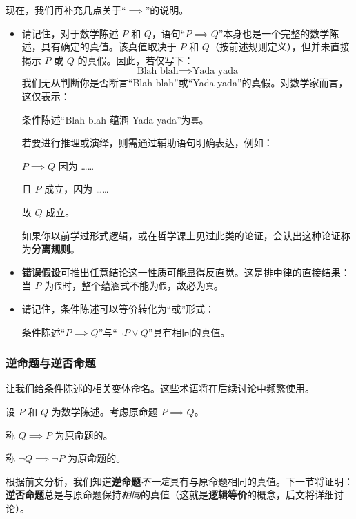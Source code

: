 现在，我们再补充几点关于``$\implies$''的说明。

\begin{itemize}
    \item 请记住，对于数学陈述 $P$ 和 $Q$，语句``$P \implies Q$''本身也是一个完整的数学陈述，具有确定的真值。该真值取决于 $P$ 和 $Q$（按前述规则定义），但并未直接揭示 $P$ 或 $Q$ 的真假。因此，若仅写下：
    \[\text{Blah blah} \implies \text{Yada yada}\]
    我们无从判断你是否断言``Blah blah''或``Yada yada''的真假。对数学家而言，这仅表示：
    \begin{center}
        条件陈述``Blah blah 蕴涵 Yada yada''为\verb|真|。
    \end{center}
    若要进行推理或演绎，则需通过辅助语句明确表达，例如：
    \begin{center}
        $P \implies Q$ 因为 ……

        且 $P$ 成立，因为 ……

        故 $Q$ 成立。
    \end{center}
    如果你以前学过形式逻辑，或在哲学课上见过此类的论证，会认出这种论证称为\textbf{分离规则}。\label{sec:section4.5.6}
    \item \textbf{错误假设}可推出任意结论这一性质可能显得反直觉。这是排中律的直接结果：当 $P$ 为\verb|假|时，整个蕴涵式不能为\verb|假|，故必为\verb|真|。
    \item 请记住，条件陈述可以等价转化为``或''形式：
        \begin{center}
            条件陈述``$P \implies Q$''与``$\neg P \lor Q$''具有相同的真值。
        \end{center}
\end{itemize}

\subsubsection*{逆命题与逆否命题}

让我们给条件陈述的相关变体命名。这些术语将在后续讨论中频繁使用。

\begin{definition}
    设 $P$ 和 $Q$ 为数学陈述。考虑原命题 $P \implies Q$。

    称 $Q \implies P$ 为原命题的。

    称 $\neg Q \implies \neg P$ 为原命题的。
\end{definition}

根据前文分析，我们知道\textbf{逆命题}\emph{不一定}具有与原命题相同的真值。下一节将证明：\textbf{逆否命题}总是与原命题保持\emph{相同}的真值（这就是\textbf{逻辑等价}的概念，后文将详细讨论）。

